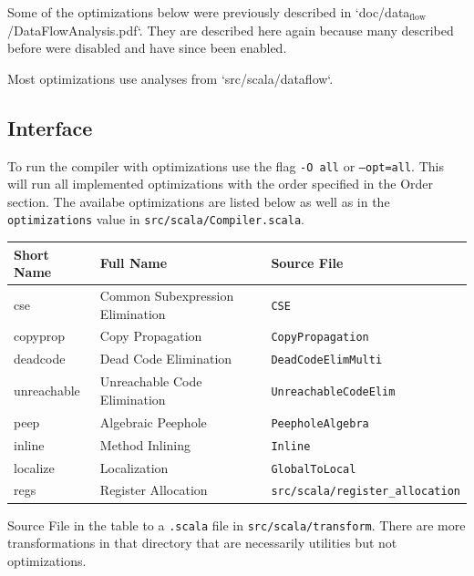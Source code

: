 \documentclass[11pt]{article}
\begin{document}
  Some of the optimizations below were previously described in `doc/data$_{\mathrm{flow}}$/DataFlowAnalysis.pdf`.
  They are described here again because many described before were disabled and have since been enabled.
  
  Most optimizations use analyses from `src/scala/dataflow`.

\subsection{Interface}
\label{sec-2.1}


  To run the compiler with optimizations use the flag \texttt{-O all} or \texttt{--opt=all}. This will run all implemented
  optimizations with the order specified in the Order section.
  The availabe optimizations are listed below as well as in the \texttt{optimizations} value in \texttt{src/scala/Compiler.scala}.



\begin{center}
\begin{tabular}{lll}
 Short Name   &  Full Name                         &  Source File                              \\
\hline
 cse          &  Common Subexpression Elimination  &  \texttt{CSE}                             \\
 copyprop     &  Copy Propagation                  &  \texttt{CopyPropagation}                 \\
 deadcode     &  Dead Code Elimination             &  \texttt{DeadCodeElimMulti}               \\
 unreachable  &  Unreachable Code Elimination      &  \texttt{UnreachableCodeElim}             \\
 peep         &  Algebraic Peephole                &  \texttt{PeepholeAlgebra}                 \\
 inline       &  Method Inlining                   &  \texttt{Inline}                          \\
 localize     &  Localization                      &  \texttt{GlobalToLocal}                   \\
 regs         &  Register Allocation               &  \texttt{src/scala/register\_allocation}  \\
\end{tabular}
\end{center}



  Source File in the table to a \texttt{.scala} file in \texttt{src/scala/transform}. There are more transformations
  in that directory that are necessarily utilities but not optimizations.
\end{document}
